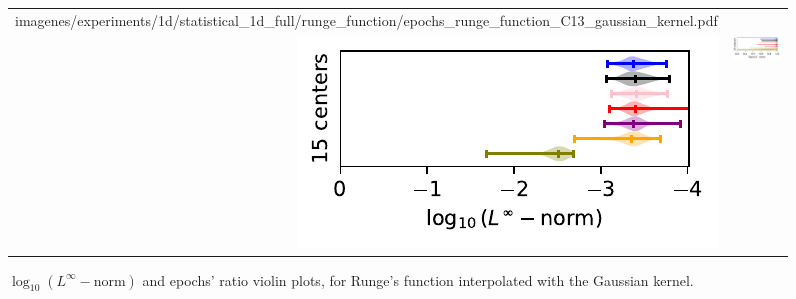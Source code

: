 \documentclass[12pt]{report} %
\begin{document}
\begin{figure}[H]
\begin{tabular}{rl}
{        {imagenes/experiments/1d/statistical_1d_full/runge_function/epochs_runge_function_C13_gaussian_kernel.pdf}}
    \\
    {\includegraphics[width=.5\textwidth, trim={0 0.2cm 0 0},clip=true]
    {imagenes/experiments/1d/statistical_1d_full/runge_function/linf_runge_function_C15_gaussian_kernel.pdf}}
                                                                                                              & 
  {\includegraphics[width=.44\textwidth, trim={.7cm 0.2cm 0 0},clip=true]
        {imagenes/experiments/1d/statistical_1d_full/runge_function/epochs_runge_function_C15_gaussian_kernel.pdf}}
  \end{tabular}
  \caption{$\log_{10}(L^\infty-\text{norm})$ and epochs' ratio violin plots, for Runge's function interpolated with the Gaussian kernel.}
  \label{fig:statistic-result-runge-function-gaussian-kernel}
\end{figure}
\end{document}
